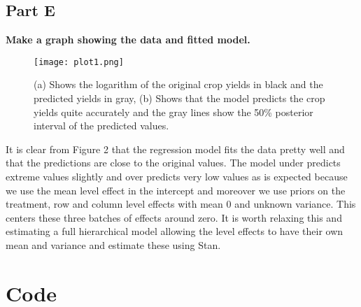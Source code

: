 \documentclass{article}
\begin{document}
\subsection{Part E}
\textbf{Make a graph showing the data and fitted model.}
 \begin{figure}[H]
\centering
\texttt{[image: plot1.png]}
\caption{(a) Shows the logarithm of the original crop yields in black and the predicted yields in gray, (b) Shows that the model predicts the crop yields quite accurately and the gray lines show the 50\% posterior interval of the predicted values.}
\label{deltat}
\end{figure}
It is clear from Figure 2 that the regression model fits the data pretty well and that the predictions are close to the original values. The model under predicts extreme values slightly and over predicts  very low values as is expected because we use the mean level effect in the intercept and moreover we use priors on the treatment, row and column level effects with mean 0 and unknown variance. This centers these three batches of effects around zero. It is worth relaxing this and estimating a full hierarchical model allowing the level effects to have their own mean and variance and estimate these using Stan.

\section{Code}
\end{document}
